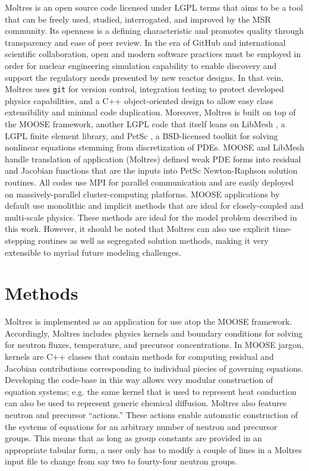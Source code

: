 \documentclass{article}
\let\Oldsection\section
\renewcommand{\section}{\FloatBarrier\Oldsection}
\begin{document}
Moltres is an open source code licensed under \gls{LGPL} terms that aims to be a
tool that can be freely used, studied, interrogated, and improved by the
\gls{MSR} community.  Its openness is a defining characteristic and promotes
quality through transparency and ease of peer review. In the era of
GitHub\cite{noauthor_build_nodate} and international scientific collaboration,
open and modern software practices must be employed in order for nuclear
engineering simulation capability to enable discovery and support the regulatory
needs presented by new reactor designs. In that vein, Moltres uses
\texttt{git} for version control, integration testing to protect
developed physics capabilities, and a C++ object-oriented design to allow easy
class extensibility and minimal code duplication. Moreover, Moltres is built on
top of the \gls{MOOSE} framework, \cite{gaston_physics-based_2015} another
\gls{LGPL} code that itself leans on LibMesh \cite{kirk_libmesh:_2006}, a
\gls{LGPL} finite element library, and PetSc \cite{satish_balay_petsc_2015}, a
\gls{BSD}-licensed toolkit for solving nonlinear equations stemming from
discretization of PDEs. \gls{MOOSE} and LibMesh handle translation of
application (Moltres) defined weak PDE forms into residual and Jacobian
functions that are the inputs into PetSc Newton-Raphson solution routines. All
codes use MPI for parallel communication and are easily deployed on
massively-parallel cluster-computing platforms. \gls{MOOSE} applications by
default use monolithic and implicit methods that are ideal for closely-coupled
and multi-scale physics. These methods are ideal for the model problem described
in this work. However, it should be noted that Moltres can also use explicit
time-stepping routines as well as segregated solution methods, making it very
extensible to myriad future modeling challenges.

\section{Methods}

Moltres \cite{lindsay_arfc/moltres_nodate} is implemented as an application for
use atop the \gls{MOOSE} \cite{gaston_physics-based_2015} framework.
Accordingly, Moltres includes physics kernels and boundary conditions for
solving for neutron fluxes, temperature, and precursor concentrations. In \gls{MOOSE}
jargon, kernels are C++ classes that contain methods for computing residual and
Jacobian contributions corresponding to individual piecies of governing
equations. Developing the code-base in this way allows very modular construction
of equation systems; e.g. the same kernel that is used to represent heat
conduction can also be used to represent generic chemical diffusion. Moltres
also features neutron and precursor ``actions.'' These actions enable automatic
construction of the systems of equations for an arbitrary number of neutron and
precursor groups. This means that as long as group constants are provided in an appropriate
tabular form, a user only has to modify a couple of lines in a Moltres input
file to change from say two to fourty-four neutron groups.
\end{document}
